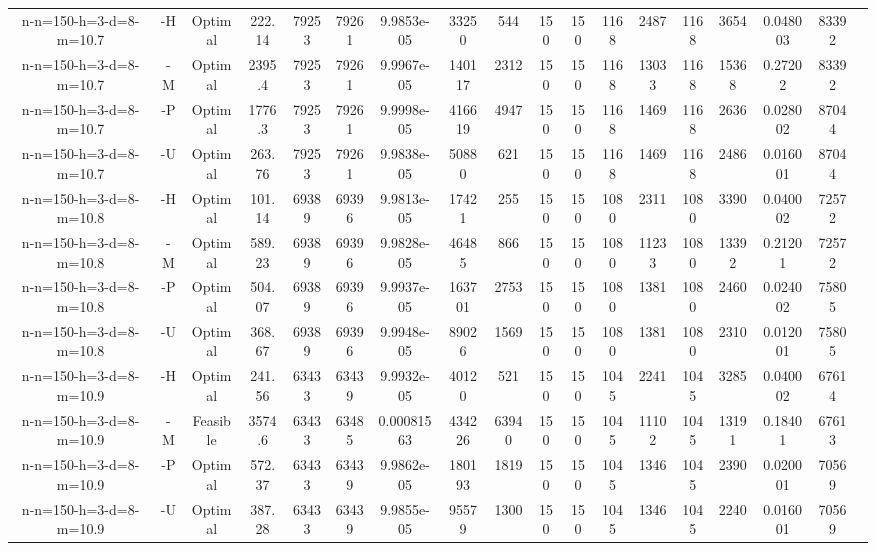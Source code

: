 \documentclass[landscape, a4paper]{article}
\begin{document}
\begin{center}
\begin{tabular}{@{}cccccccccccccccccc@{}}
n-n=150-h=3-d=8-m=10.7 & -H & Optimal & 222.14 & 79253 & 79261 & 9.9853e-05 & 33250 & 544 & 150 & 150 & 1168 & 2487 & 1168 & 3654 & 0.048003 & 83392 & \\
n-n=150-h=3-d=8-m=10.7 & -M & Optimal & 2395.4 & 79253 & 79261 & 9.9967e-05 & 140117 & 2312 & 150 & 150 & 1168 & 13033 & 1168 & 15368 & 0.27202 & 83392 & \\
n-n=150-h=3-d=8-m=10.7 & -P & Optimal & 1776.3 & 79253 & 79261 & 9.9998e-05 & 416619 & 4947 & 150 & 150 & 1168 & 1469 & 1168 & 2636 & 0.028002 & 87044 & \\
n-n=150-h=3-d=8-m=10.7 & -U & Optimal & 263.76 & 79253 & 79261 & 9.9838e-05 & 50880 & 621 & 150 & 150 & 1168 & 1469 & 1168 & 2486 & 0.016001 & 87044 & \\
n-n=150-h=3-d=8-m=10.8 & -H & Optimal & 101.14 & 69389 & 69396 & 9.9813e-05 & 17421 & 255 & 150 & 150 & 1080 & 2311 & 1080 & 3390 & 0.040002 & 72572 & \\
n-n=150-h=3-d=8-m=10.8 & -M & Optimal & 589.23 & 69389 & 69396 & 9.9828e-05 & 46485 & 866 & 150 & 150 & 1080 & 11233 & 1080 & 13392 & 0.21201 & 72572 & \\
n-n=150-h=3-d=8-m=10.8 & -P & Optimal & 504.07 & 69389 & 69396 & 9.9937e-05 & 163701 & 2753 & 150 & 150 & 1080 & 1381 & 1080 & 2460 & 0.024002 & 75805 & \\
n-n=150-h=3-d=8-m=10.8 & -U & Optimal & 368.67 & 69389 & 69396 & 9.9948e-05 & 89026 & 1569 & 150 & 150 & 1080 & 1381 & 1080 & 2310 & 0.012001 & 75805 & \\
n-n=150-h=3-d=8-m=10.9 & -H & Optimal & 241.56 & 63433 & 63439 & 9.9932e-05 & 40120 & 521 & 150 & 150 & 1045 & 2241 & 1045 & 3285 & 0.040002 & 67614 & \\
n-n=150-h=3-d=8-m=10.9 & -M & Feasible & 3574.6 & 63433 & 63485 & 0.00081563 & 434226 & 63940 & 150 & 150 & 1045 & 11102 & 1045 & 13191 & 0.18401 & 67613 & \\
n-n=150-h=3-d=8-m=10.9 & -P & Optimal & 572.37 & 63433 & 63439 & 9.9862e-05 & 180193 & 1819 & 150 & 150 & 1045 & 1346 & 1045 & 2390 & 0.020001 & 70569 & \\
n-n=150-h=3-d=8-m=10.9 & -U & Optimal & 387.28 & 63433 & 63439 & 9.9855e-05 & 95579 & 1300 & 150 & 150 & 1045 & 1346 & 1045 & 2240 & 0.016001 & 70569 & \\
\end{tabular}
\end{center}
\end{document}
